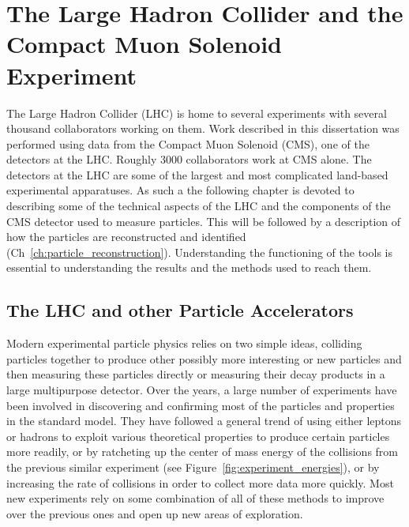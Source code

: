 \chapter{The Large Hadron Collider and the Compact Muon Solenoid Experiment}
\label{ch:LHC}

The Large Hadron Collider (LHC) is home to several experiments with several thousand collaborators working on them. Work described in this dissertation was performed using data from the Compact Muon Solenoid (CMS), one of the detectors at the LHC. Roughly 3000 collaborators work at CMS alone. The detectors at the LHC are some of the largest and most complicated land-based experimental apparatuses. As such a the following chapter is devoted to describing some of the technical aspects of the LHC and the components of the CMS detector used to measure particles. This will be followed by a description of how the particles are reconstructed and identified (Ch~\ref{ch:particle_reconstruction}). Understanding the functioning of the tools is essential to understanding the results and the methods used to reach them.\\

	\section{The LHC and other Particle Accelerators}
	Modern experimental particle physics relies on two simple ideas, colliding particles together to produce other possibly more interesting or new particles and then measuring these particles directly or measuring their decay products in a large multipurpose detector. Over the years, a large number of experiments have been involved in discovering and confirming most of the particles and properties in the standard model. They have followed a general trend of using either leptons or hadrons to exploit various theoretical properties to produce certain particles more readily, or by ratcheting up the center of mass energy of the collisions from the previous similar experiment (see Figure~\ref{fig:experiment_energies}), or by increasing the rate of collisions in order to collect more data more quickly. Most new experiments rely on some combination of all of these methods to improve over the previous ones and open up new areas of exploration.\\
	
